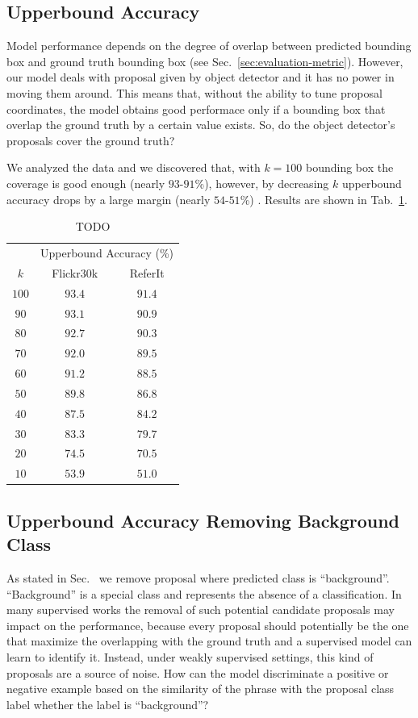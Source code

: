 \subsection{Upperbound Accuracy}

Model performance depends on the degree of overlap between predicted
bounding box and ground truth bounding box (see
Sec.~\ref{sec:evaluation-metric}). However, our model deals with
proposal given by object detector and it has no power in moving them
around. This means that, without the ability to tune proposal
coordinates, the model obtains good performace only if a bounding box
that overlap the ground truth by a certain value exists. So, do the
object detector's proposals cover the ground truth?

We analyzed the data and we discovered that, with $k = 100$ bounding
box the coverage is good enough (nearly $93$-$91$\%), however, by
decreasing $k$ upperbound accuracy drops by a large margin (nearly
$54$-$51$\%) . Results are shown in Tab.~\ref{tab:bb-coverage}.

\begin{table}
  \centering
  \begin{tabular}{c|cc}
     & \multicolumn{2}{c}{Upperbound Accuracy (\%)} \\
    $k$ & Flickr30k & ReferIt \\\hline 
    $100$ & $93.4$ & $91.4$ \\ 
     $90$ & $93.1$ & $90.9$ \\  
     $80$ & $92.7$ & $90.3$ \\
     $70$ & $92.0$ & $89.5$ \\
     $60$ & $91.2$ & $88.5$ \\
     $50$ & $89.8$ & $86.8$ \\
     $40$ & $87.5$ & $84.2$ \\
     $30$ & $83.3$ & $79.7$ \\
     $20$ & $74.5$ & $70.5$ \\
     $10$ & $53.9$ & $51.0$ \\\hline
  \end{tabular}
  \caption[TODO]{TODO}
  \label{tab:bb-coverage}
\end{table}

\subsection{Upperbound Accuracy Removing Background Class}

As stated in Sec.~ we remove proposal where
predicted class is ``background''. ``Background'' is a special class
and represents the absence of a classification. In many supervised
works the removal of such potential candidate proposals may impact on
the performance, because every proposal should potentially be the one
that maximize the overlapping with the ground truth and a supervised
model can learn to identify it. Instead, under weakly supervised
settings, this kind of proposals are a source of noise. How can the
model discriminate a positive or negative example based on the
similarity of the phrase with the proposal class label whether the
label is ``background''?

